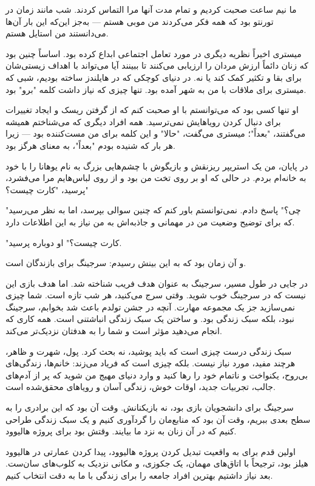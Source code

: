 ما نیم ساعت صحبت کردیم و تمام مدت آنها مرا التماس کردند. شب مانند زمان در تورنتو بود که همه فکر می‌کردند من موبی هستم — به‌جز این‌که این بار آن‌ها می‌دانستند من استایل هستم.

میستری اخیراً نظریه دیگری در مورد تعامل اجتماعی ابداع کرده بود. اساساً چنین بود که زنان دائماً ارزش مردان را ارزیابی می‌کنند تا ببینند آیا می‌تواند با اهداف زیستی‌شان برای بقا و تکثیر کمک کند یا نه. در دنیای کوچکی که در هایلندز ساخته بودیم، شبی که میستری برای ملاقات با من به شهر آمده بود. تنها چیزی که نیاز داشت کلمه "برو" بود.

او تنها کسی بود که می‌توانستم با او صحبت کنم که از گرفتن ریسک و ایجاد تغییرات برای دنبال کردن رویاهایش نمی‌ترسید. همه افراد دیگری که می‌شناختم همیشه می‌گفتند، "بعداً"؛ میستری می‌گفت، "حالا" و این کلمه برای من مست‌کننده بود — زیرا هر بار که شنیده بودم "بعداً"، به معنای هرگز بود.

در پایان، من یک استریپر ریزنقش و بازیگوش با چشم‌هایی بزرگ به نام یوهانا را با خود به خانه‌ام بردم. در حالی که او بر روی تخت من بود و از روی لباس‌هایم مرا می‌فشرد، پرسید، "کارت چیست؟"

"چی؟" پاسخ دادم. نمی‌توانستم باور کنم که چنین سوالی بپرسد، اما به نظر می‌رسید که برای توضیح وضعیت من در مهمانی و جاذبه‌اش به من نیاز به این اطلاعات دارد.

"کارت چیست؟" او دوباره پرسید.

و آن زمان بود که به این بینش رسیدم: سرجینگ برای بازندگان است.

در جایی در طول مسیر، سرجینگ به عنوان هدف فریب شناخته شد. اما هدف بازی این نیست که در سرجینگ خوب شوید. وقتی سرج می‌کنید، هر شب تازه‌ است. شما چیزی نمی‌سازید جز یک مجموعه‌ مهارت. آنچه در جشن تولدم باعث شد بخوابم، سرجینگ نبود، بلکه سبک زندگی بود. و ساختن یک سبک زندگی انباشتنی است. همه کاری که انجام می‌دهید مؤثر است و شما را به هدفتان نزدیک‌تر می‌کند.

سبک زندگی درست چیزی است که باید پوشید، نه بحث کرد. پول، شهرت و ظاهر، هرچند مفید، مورد نیاز نیست. بلکه چیزی است که فریاد می‌زند: خانم‌ها، زندگی‌های بی‌روح، یکنواخت و ناتمام خود را رها کنید و وارد دنیای مهیج من شوید که پر از آدم‌های جالب، تجربیات جدید، اوقات خوش، زندگی آسان و رویاهای محقق‌شده است.

سرجینگ برای دانشجویان بازی بود، نه بازیکنانش. وقت آن بود که این برادری را به سطح بعدی ببریم، وقت آن بود که منابع‌مان را گردآوری کنیم و یک سبک زندگی طراحی کنیم که در آن زنان به نزد ما بیایند. وقتش بود برای پروژه هالیوود.

اولین قدم برای به واقعیت تبدیل کردن پروژه هالیوود، پیدا کردن عمارتی در هالیوود هیلز بود، ترجیحاً با اتاق‌های مهمان، یک جکوزی، و مکانی نزدیک به کلوب‌های سان‌ست. بعد نیاز داشتیم بهترین افراد جامعه را برای زندگی با ما به دقت انتخاب کنیم.

